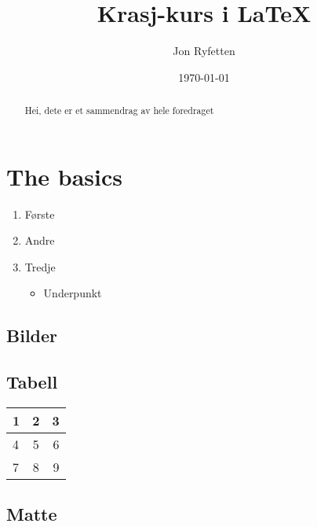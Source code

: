 \documentclass[a4paper]{article}
\title{Krasj-kurs i \LaTeX}
\author{Jon Ryfetten}
\date{\today}
\begin{document}
\maketitle

\begin{abstract}
		Hei, dete er et sammendrag av hele foredraget
		\blindtext
\end{abstract}

\section{The basics}
		\begin{enumerate}
				\item Første
				\item Andre
				\item Tredje
				\begin{itemize}
						\item Underpunkt

				\end{itemize}
		\end{enumerate}

\subsection{Bilder}



\subsection{Tabell}

		\begin{table}
				\centering      %
				\begin{tabular} {| l | c | r |} \hline
						1 & 2 & 3 \\ \hline
						4 & 5 & 6 \\ \hline
						7 & 8 & 9 \\ \hline
				\end{tabular}
		\end{table}

\subsection{Matte}
\end{document}
